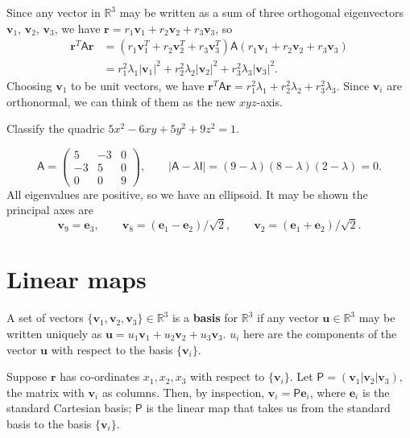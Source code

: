 \documentclass[letter-paper]{tufte-book}
\newenvironment{example}[1][Example]{\begin{trivlist}
\item[\hskip \labelsep {\bfseries #1}]}{\end{trivlist}}
\newcommand{\eb}{\boldsymbol{e}}
\newcommand{\ub}{\boldsymbol{u}}
\newcommand{\vb}{\boldsymbol{v}}
\newcommand\Def[1]{\textbf{#1}}
\begin{document}
Since any vector in $\mathbb{R}^3$ may be written as a sum of three orthogonal
eigenvectors $\vb_1$, $\vb_2$, $\vb_3$, we have $\boldsymbol{r}=r_1 \vb_1 + r_2
\vb_2 + r_3 \vb_3$, so
\begin{align*}
	\boldsymbol{r}^T \mathsf{A}\boldsymbol{r} &=
	(r_1 \vb_1^T + r_2\vb_2^T + r_3 \vb_3^T)\mathsf{A}(r_1 \vb_1 + r_2 \vb_2 +
	r_3 \vb_3)\\
	&= r_1^2 \lambda_1|\vb_1|^2 + r_2^2 \lambda_2|\vb_2|^2 +
	r_3^2 \lambda_3|\vb_3|^2.
\end{align*}
Choosing $\vb_1$ to be unit vectors, we have $\boldsymbol{r}^T
\mathsf{A}\boldsymbol{r}=r_1^2 \lambda_1 + r_2^2 \lambda_2 + r_3^2 \lambda_3$.
Since $\vb_i$ are orthonormal, we can think of them as the new $xyz$-axis.
\begin{example}
	Classify the quadric $5x^2-6xy+5y^2+9z^2=1$.
	
	\begin{equation*}
		\mathsf{A}=\begin{pmatrix}5&-3&0\\-3&5&0\\0&0&9\end{pmatrix},\qquad
		|\mathsf{A}-\lambda\mathsf{I}|=(9-\lambda)(8-\lambda)(2-\lambda)=0.
	\end{equation*}
	All eigenvalues are positive, so we have an ellipsoid. It may be shown the
	principal axes are
	\begin{equation*}
		\vb_9 = \eb_3,\qquad \vb_8=(\eb_1-\eb_2)/\sqrt{2},\qquad
		\vb_2=(\eb_1+\eb_2)/\sqrt{2}.
	\end{equation*}
\end{example}


\chapter{Linear maps}

A set of vectors $\{\vb_1,\vb_2,\vb_3\}\in\mathbb{R}^3$ is a \Def{basis}
for $\mathbb{R}^3$ if any vector $\ub\in\mathbb{R}^3$ may be written uniquely as
$\ub=u_1 \vb_1 + u_2 \vb_2 + u_3 \vb_3$. $u_i$ here are the components of the
vector $\ub$ with respect to the basis $\{\vb_i\}$.

Suppose $\boldsymbol{r}$ has co-ordinates $x_1, x_2, x_3$ with respect to
$\{\vb_i\}$. Let $\mathsf{P}=(\vb_1|\vb_2|\vb_3)$, the matrix with $\vb_i$ as
columns. Then, by inspection, $\vb_i=\mathsf{P}\eb_i$, where $\eb_i$ is the
standard Cartesian basis; $\mathsf{P}$ is the linear map that takes us from the
standard basis to the basis $\{\vb_i\}$.
\end{document}
